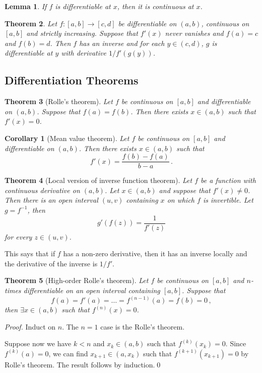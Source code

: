 \documentclass{article}
\theoremstyle{plain}\theoremheaderfont{\normalfont\itshape}\theorembodyfont{\rmfamily}\theoremseparator{.}\newtheorem*{rem}{Remark}\newtheorem*{ex}{Example}\newtheorem*{proof}{Proof}\newtheorem*{altp}{Alternative proof}
\theoremstyle{plain}\theoremheaderfont{\normalfont\bfseries}\theorembodyfont{\rmfamily}\theoremseparator{.}\newtheorem{thm}{Theorem}[section]\newtheorem{lem}[thm]{Lemma}\newtheorem{prop}[thm]{Proposition}\newtheorem*{cor}{Corollary}\newtheorem{defn}[thm]{Definition}\newtheorem{clm}[thm]{Claim}\newtheorem{clminproof}{Claim}
\theoremstyle{break}\theoremheaderfont{\normalfont\itshape}\theorembodyfont{\rmfamily}\theoremseparator{.\medskip}\newtheorem*{proofskip}{Proof}\newtheorem*{exs}{Examples}\newtheorem*{rems}{Remarks}
\theoremstyle{break}\theoremheaderfont{\normalfont\bfseries}\theorembodyfont{\rmfamily}\theoremseparator{.\medskip}\newtheorem{lemskip}[thm]{Lemma}\newtheorem{defnskip}[thm]{Definition}\newtheorem{propskip}[thm]{Proposition}\newtheorem{thmskip}[thm]{Theorem}
\newcommand{\qed}{\hfill\ensuremath{\Box}}
\begin{document}
    \begin{lem}
        If \(f\) is differentiable at \(x\), then it is continuous at \(x\).
    \end{lem}
    \begin{thm}
        Let \(f:[a,b]\to[c,d]\) be differentiable on \((a,b)\), continuous on \([a,b]\) and strictly increasing. Suppose that \(f'(x)\) never vanishes and \(f(a)=c\) and \(f(b)=d\). Then \(f\) has an inverse and for each \(y\in(c,d)\), \(g\) is differentiable at \(y\) with derivative \(1/f'(g(y))\).
    \end{thm}
    \subsection{Differentiation Theorems}
    \begin{thm}[Rolle's theorem]
        Let \(f\) be continuous on \([a,b]\) and differentiable on \((a,b)\). Suppose that \(f(a)=f(b)\). Then there exists \(x\in(a,b)\) such that \(f'(x)=0\).
    \end{thm}
    \begin{cor}[Mean value theorem]
        Let \(f\) be continuous on \([a,b]\) and differentiable on \((a,b)\). Then there exists \(x\in(a,b)\) such that
        \[f'(x)=\frac{f(b)-f(a)}{b-a}\,.\]
    \end{cor}
    \begin{thm}[Local version of inverse function theorem]
        Let \(f\) be a function with continuous derivative on \((a,b)\). Let \(x\in (a,b)\) and suppose that \(f'(x)\ne 0\). Then there is an open interval \((u,v)\) containing \(x\) on which \(f\) is invertible. Let \(g=f^{-1}\), then
        \[g'(f(z))=\frac{1}{f'(z)}\]
        for every \(z\in(u,v)\).
    \end{thm}
    This says that if \(f\) has a non-zero derivative, then it has an inverse locally and the derivative of the inverse is \(1/f'\).
    \begin{thm}[High-order Rolle's theorem]
        Let \(f\) be continuous on \([a,b]\) and \(n\)-times differentiable on an open interval containing \([a,b]\). Suppose that
        \[f(a)=f'(a)=\dots=f^{(n-1)}(a)=f(b)=0\,,\]
        then \(\exists x\in(a,b)\) such that \(f^{(n)}(x)=0\).
    \end{thm}
    \begin{proof}
        Induct on \(n\). The \(n=1\) case is the Rolle's theorem.

        Suppose now we have \(k<n\) and \(x_k\in(a,b)\) such that \(f^{(k)}(x_k)=0\). Since \(f^{(k)}(a)=0\), we can find \(x_{k+1}\in(a,x_k)\) such that \(f^{(k+1)}(x_{k+1})=0\) by Rolle's theorem. The result follows by induction.\qed
    \end{proof}
\end{document}
